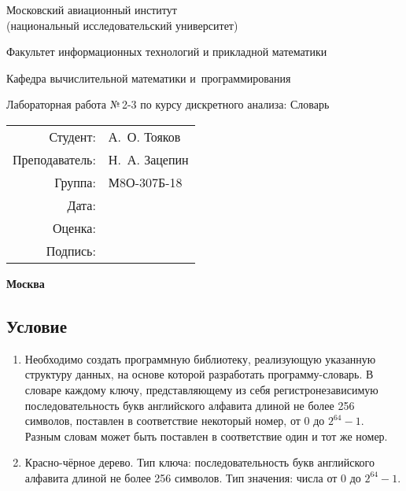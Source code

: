 \documentclass[12pt]{article}
\begin{document}
\thispagestyle{empty}
\begin{center}
	\bfseries

	{\Large Московский авиационный институт\\ (национальный исследовательский университет)

	}

	\vspace{48pt}

	{\large Факультет информационных технологий и прикладной математики
	}

	\vspace{36pt}


	{\large Кафедра вычислительной математики и~программирования

	}


	\vspace{48pt}

	{Лабораторная работа №\,2-3 по курсу дискретного анализа: Словарь}

\end{center}

\vspace{72pt}

\begin{flushright}
	\begin{tabular}{rl}
		Студент:       & А.\, О. Тояков   \\
		Преподаватель: & Н.\, А. Зацепин \\
		Группа:        & М8О-307Б-18      \\
		Дата:          &                 \\
		Оценка:        &                  \\
		Подпись:       &                  \\
	\end{tabular}
\end{flushright}

\vfill

\begin{center}
	\bfseries
	Москва\\
	\the\year
\end{center}

\newpage

\subsection*{Условие}

\begin{enumerate}
\item Необходимо создать программную библиотеку, реализующую указанную структуру данных, на основе которой разработать программу-словарь. В словаре каждому ключу, представляющему из себя регистронезависимую последовательность букв английского алфавита длиной не более 256 символов, поставлен в соответствие некоторый номер, от 0 до $2^{64} - 1$. Разным словам может быть поставлен в соответствие один и тот же номер.
\item Красно-чёрное дерево. Тип ключа: последовательность букв английского алфавита длиной не более 256 символов. Тип значения: числа от 0 до $2^{64} - 1$.
\end{enumerate}
\end{document}
